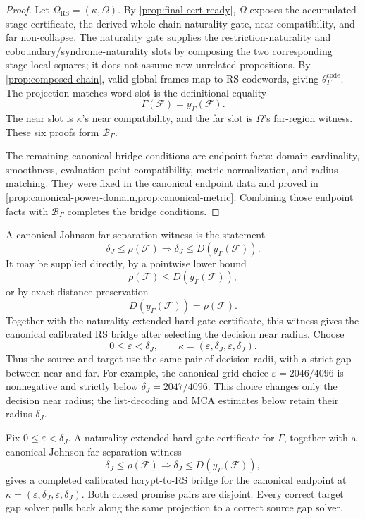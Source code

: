 \begin{proof}
Let \(\Omega_{\mathrm{RS}}=(\kappa,\Omega)\). By
\cref{prop:final-cert-ready}, \(\Omega\) exposes the accumulated stage
certificate, the derived whole-chain naturality gate, near compatibility, and
far non-collapse. The naturality gate supplies the restriction-naturality and
coboundary/syndrome-naturality slots by composing the two corresponding
stage-local squares; it does not assume new unrelated propositions. By
\cref{prop:composed-chain}, valid global frames map to RS codewords, giving
\(\theta^{\mathrm{code}}_\Gamma\). The projection-matches-word slot is the
definitional equality
\[
  \Gamma(\mathcal F)=y_\Gamma(\mathcal F).
\]
The near slot is \(\kappa\)'s near compatibility, and the far slot is
\(\Omega\)'s far-region witness. These six proofs form
\(\mathcal B_\Gamma\).

The remaining canonical bridge conditions are endpoint facts: domain
cardinality, smoothness, evaluation-point compatibility, metric normalization,
and radius matching. They were fixed in the canonical endpoint data and proved
in \cref{prop:canonical-power-domain,prop:canonical-metric}. Combining those
endpoint facts with \(\mathcal B_\Gamma\) completes the bridge conditions.
\end{proof}

A canonical Johnson far-separation witness is the statement
\[
  \delta_J\le \rho(\mathcal F)
  \Longrightarrow
  \delta_J\le D(y_\Gamma(\mathcal F)).
\]
It may be supplied directly, by a pointwise lower bound
\[
  \rho(\mathcal F)\le D(y_\Gamma(\mathcal F)),
\]
or by exact distance preservation
\[
  D(y_\Gamma(\mathcal F))=\rho(\mathcal F).
\]
Together with the naturality-extended hard-gate certificate, this witness gives
the canonical calibrated RS bridge after selecting the decision near radius.
Choose
\[
  0\le\varepsilon<\delta_J,
  \qquad
  \kappa=(\varepsilon,\delta_J,\varepsilon,\delta_J).
\]
Thus the source and target use the same pair of decision radii, with a strict
gap between near and far. For example, the canonical grid choice
\(\varepsilon=2046/4096\) is nonnegative and strictly below
\(\delta_J=2047/4096\). This choice changes only the decision near radius;
the list-decoding and MCA estimates below retain their radius \(\delta_J\).

\begin{proposition}\label{prop:canonical-bridge}
Fix \(0\le\varepsilon<\delta_J\). A naturality-extended hard-gate
certificate for \(\Gamma\), together with a
canonical Johnson far-separation witness
\[
  \delta_J\le \rho(\mathcal F)
  \Longrightarrow
  \delta_J\le D(y_\Gamma(\mathcal F)),
\]
gives a completed calibrated hcrypt-to-RS bridge for the canonical endpoint
at \(\kappa=(\varepsilon,\delta_J,\varepsilon,\delta_J)\).
Both closed promise pairs are disjoint. Every correct target gap solver
pulls back along the same projection to a correct source gap solver.
\end{proposition}

